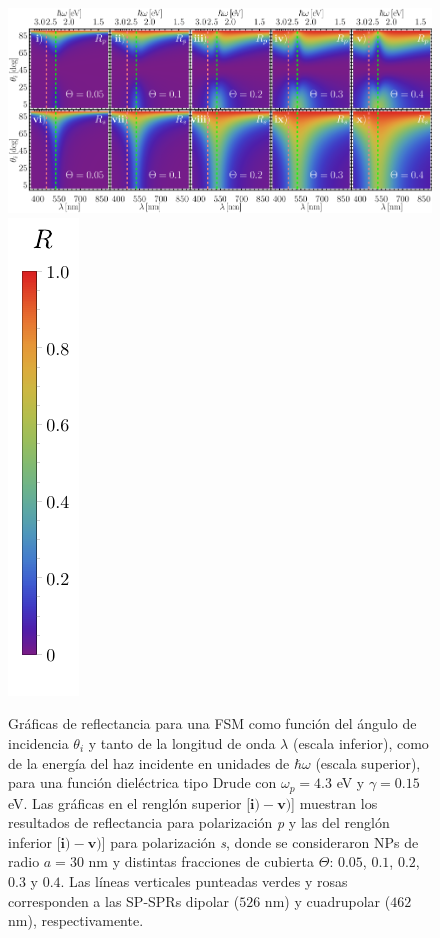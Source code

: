 	\begin{figure}[h!]\centering
\includegraphics[width = .9\linewidth	]{2-Resultados/figs/4-Wp4FSMThetaVar/0-2D_Grid.png}%
\includegraphics[scale=.85, trim={00 -5 00 00}, clip]{2-Resultados/figs/0-RBar_v}\vspace*{-1em}
	\caption{Gráficas de reflectancia para una FSM como función del ángulo de incidencia $\theta_i$ y tanto de la longitud de onda $\lambda$ (escala inferior), como de la energía del haz incidente en unidades de $\hbar\omega$ (escala superior), para una función dieléctrica tipo Drude con $\omega_p=4. 3$ eV  y  $\gamma=0. 15$ eV.  Las gráficas   en el renglón superior [$\mathbf{i)-v)}$]  muestran los resultados de reflectancia para  polarización \emph{p} y las del renglón inferior  [$\mathbf{i)-v)}$] para polarización  \emph{s}, donde se consideraron NPs de radio $a=30$ nm y distintas fracciones de cubierta $\Theta$: $0. 05$, $0. 1$, $0. 2$, $0. 3$ y $0. 4$. Las líneas verticales punteadas verdes y rosas corresponden a las SP-SPRs dipolar ($526$ nm) y cuadrupolar ($462$ nm), respectivamente.}	\label{fig:R-FSM}	
	\end{figure}		
					
